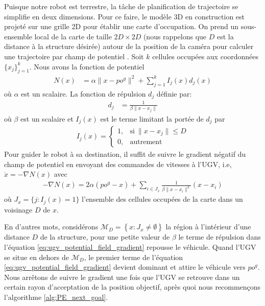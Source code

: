 Puisque notre robot est terrestre, la tâche de planification de trajectoire se simplifie en deux dimensions. Pour ce faire, le modèle 3D en construction est projeté sur une grille 2D pour établir une carte d'occupation. On prend un sous-ensemble local de la carte de taille $2D \times 2D$ (nous rappelons que $D$ est la distance à la structure désirée) autour de la position de la caméra pour calculer une trajectoire par champ de potentiel \citep{Khatib1990, Choset2005}. Soit $k$ cellules occupées aux coordonnées $\{x_j\}^k_{j=1}$. Nous avons la fonction de potentiel
\begin{align}
  N(x) &= \alpha \| x - {po}^g \|^2 + \sum^k_{j=1} I_j(x)d_j(x)
\end{align}
où $\alpha$ est un scalaire. La fonction de répulsion $d_j$ définie par:
\begin{align}
  d_j &= \frac{1}{\beta \| x - x_j \|}
\end{align}
où $\beta$ est un scalaire et $I_j(x)$ est le terme limitant la portée de $d_j$ par
\begin{align}
  I_j(x) =     \begin{cases}
      1, & \text{si}\ \|x - x_j\| \leq D \\
      0, & \text{autrement}
    \end{cases}
\end{align}
Pour guider le robot à sa destination, il suffit de suivre le gradient négatif du champ de potentiel en envoyant des commandes de vitesses à l'UGV, i.e, $\dot x = -\nabla N(x)$ avec
\begin{align}
  - \nabla N(x) = 2 \alpha ({po}^g - x) + \sum_{i \in J_x}\frac{1}{\beta \| x - x_i\|^3}(x - x_i)
  \label{eq:ugv_potential_field_gradient}
\end{align}
où $J_x = \{ j : I_j(x) = 1\}$ l'ensemble des cellules occupées de la carte dans un voisinage $D$ de $x$.

En d'autres mots, considérons $\mathcal M_D = \left\lbrace x : J_{x} \neq \emptyset \right\rbrace $ la région à l'intérieur d'une distance $D$ de la structure, pour une petite valeur de $\beta$ le terme de répulsion dans l'équation \ref{eq:ugv_potential_field_gradient} repousse le véhicule. Quand l'UGV se situe en dehors de $\mathcal M_D$, le premier terme de l'équation \ref{eq:ugv_potential_field_gradient} devient dominant et attire le véhicule vers $po^g$. Nous arrêtons de suivre le gradient une fois que l'UGV se retrouve dans un certain rayon d'acceptation de la position objectif, après quoi nous recommençons l'algorithme \ref{alg:PE_next_goal}.

